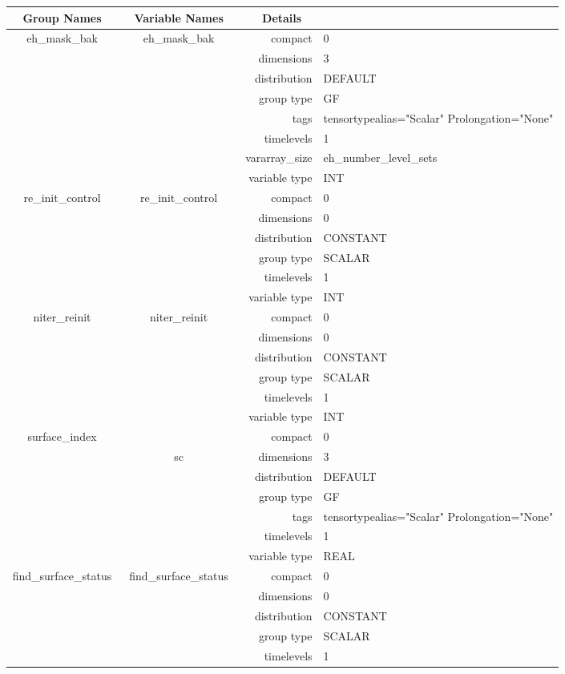\begin{tabular*}{150mm}{|c|c@{\extracolsep{\fill}}|rl|} \hline 
~ {\bf Group Names} ~ & ~ {\bf Variable Names} ~  &{\bf Details} ~ & ~ \\ 
\hline 
eh\_mask\_bak & eh\_mask\_bak & compact & 0 \\ 
 &  & dimensions & 3 \\ 
 &  & distribution & DEFAULT \\ 
 &  & group type & GF \\ 
 &  & tags & tensortypealias="Scalar" Prolongation="None" \\ 
 &  & timelevels & 1 \\ 
 &  & vararray\_size & eh\_number\_level\_sets \\ 
 &  & variable type & INT \\ 
\hline 
re\_init\_control & re\_init\_control & compact & 0 \\ 
 &  & dimensions & 0 \\ 
 &  & distribution & CONSTANT \\ 
 &  & group type & SCALAR \\ 
 &  & timelevels & 1 \\ 
 &  & variable type & INT \\ 
\hline 
niter\_reinit & niter\_reinit & compact & 0 \\ 
 &  & dimensions & 0 \\ 
 &  & distribution & CONSTANT \\ 
 &  & group type & SCALAR \\ 
 &  & timelevels & 1 \\ 
 &  & variable type & INT \\ 
\hline 
surface\_index &  & compact & 0 \\ 
 & sc & dimensions & 3 \\ 
 &  & distribution & DEFAULT \\ 
 &  & group type & GF \\ 
 &  & tags & tensortypealias="Scalar" Prolongation="None" \\ 
 &  & timelevels & 1 \\ 
 &  & variable type & REAL \\ 
\hline 
find\_surface\_status & find\_surface\_status & compact & 0 \\ 
 &  & dimensions & 0 \\ 
 &  & distribution & CONSTANT \\ 
 &  & group type & SCALAR \\ 
 &  & timelevels & 1 \\ 

\end{tabular*}
